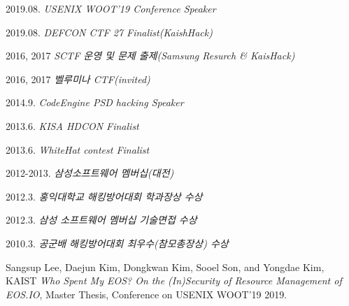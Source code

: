     \begin{activity}
    	\item 2019.08. \textit{USENIX WOOT'19 Conference Speaker}		
        \item 2019.08. \textit{DEFCON CTF 27 Finalist(KaishHack)}
        \item 2016, 2017 \textit{SCTF 운영 및 문제 출제(Samsung Resurch \& KaisHack)}
        \item 2016, 2017 \textit{벨루미나 CTF(invited)}
        \item 2014.9. \textit{CodeEngine PSD hacking Speaker}
        \item 2013.6. \textit{KISA HDCON Finalist}
        \item 2013.6. \textit{WhiteHat contest Finalist}
        \item 2012-2013. \textit{삼성소프트웨어 멤버십(대전)}
        \item 2012.3. \textit{홍익대학교 해킹방어대회 학과장상 수상 }
        \item 2012.3. \textit{삼성 소프트웨어 멤버십 기술면접 수상}
        \item 2010.3. \textit{공군배 해킹방어대회 최우수(참모총장상) 수상}
    \end{activity}

		\begin{publication}
				\item Sangsup Lee, Daejun Kim, Dongkwan Kim, Sooel Son, and Yongdae Kim, KAIST \textit{Who Spent My EOS? On the (In)Security of Resource Management of EOS.IO}, Master Thesis, Conference on USENIX WOOT'19 2019.
		\end{publication}
